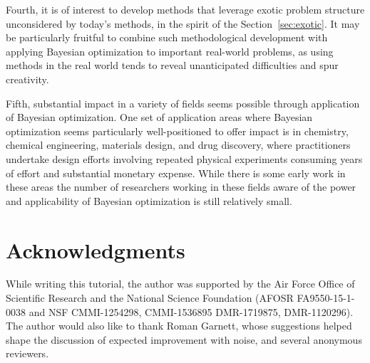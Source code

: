 \documentclass{article}
\begin{document}
Fourth, it is of interest to develop methods that leverage exotic problem structure unconsidered by today's methods, in the spirit of the Section~\ref{sec:exotic}.  It may be particularly fruitful to combine such methodological development with applying Bayesian optimization to important real-world problems, as using methods in the real world tends to reveal unanticipated difficulties and spur creativity.  

Fifth, substantial impact in a variety of fields seems possible through application of Bayesian optimization.  One set of application areas where Bayesian optimization seems particularly well-positioned to offer impact is in chemistry, chemical engineering, materials design, and drug discovery, where practitioners undertake design efforts involving repeated physical experiments consuming years of effort and substantial monetary expense.  While there is some early work in these areas \citep{ueno2016combo,frazier2016bayesian,FrazierNegoescuPowell2011,seko2015prediction,ju2017designing} the number of researchers working in these fields aware of the power and applicability of Bayesian optimization is still relatively small.

\section*{Acknowledgments}
While writing this tutorial, the author was supported by the Air Force Office of Scientific Research and the National Science Foundation
(AFOSR FA9550-15-1-0038 and NSF CMMI-1254298, CMMI-1536895 DMR-1719875, DMR-1120296).  The author would also like to thank Roman Garnett, whose suggestions helped shape the discussion of expected improvement with noise, and several anonymous reviewers.



\end{document}
